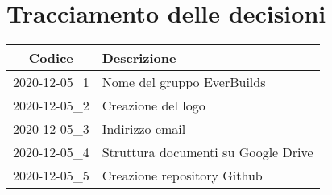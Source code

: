 \section*{Tracciamento delle decisioni}

\begin{center}
	\begin{longtable}{|c|p{12.25cm}|}
	\hline
	\rowcolor{lighter-grayer}
	\textbf{Codice} & \textbf{Descrizione} \\
	\hline
	\endfirsthead

	\hline
	2020-12-05\_1 & Nome del gruppo EverBuilds\\
	\hline
	2020-12-05\_2 & Creazione del logo\\
	\hline
	2020-12-05\_3 & Indirizzo email\\
	\hline
	2020-12-05\_4 & Struttura documenti su Google Drive\\
	\hline
	2020-12-05\_5 & Creazione repository Github\\
	\hline
	\end{longtable}
\end{center}
